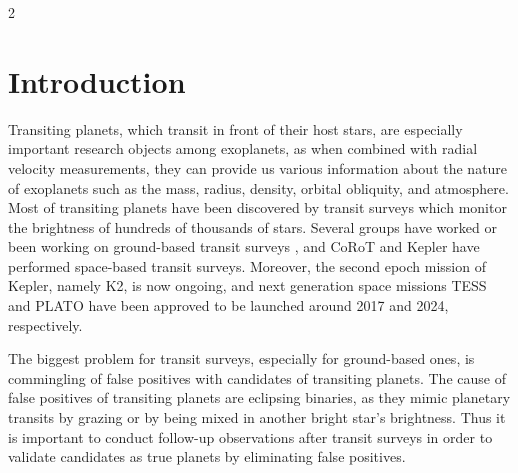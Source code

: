 \documentclass[a4paper,12pt]{spieman}  %
\begin{document}
\begin{spacing}{2}   %

\section{Introduction}
\label{sect:intro}  %

Transiting planets, which transit in front of their host stars, are especially
important research objects among exoplanets, as when combined with radial velocity measurements,
they can provide us various information about the nature of exoplanets such as
the mass, radius, density, orbital obliquity, and atmosphere.
Most of transiting planets have been discovered by transit surveys which monitor the brightness
of hundreds of thousands of stars.
Several groups have worked or been working on ground-based transit surveys
\cite{2007ApJ...656..552B,2007MNRAS.375..951C,2012ApJ...761..123S},
and CoRoT\cite{2006cosp...36.3749B} and Kepler\cite{2010Sci...327..977B} have performed space-based transit surveys.
Moreover, the second epoch mission of Kepler, namely K2\cite{2014PASP..126..398H}, is now ongoing,
and next generation space missions TESS\cite{2015JATIS...1a4003R} and
PLATO\cite{2014ExA....38..249R} have been approved to be launched around 2017 and 2024, respectively.

The biggest problem for transit surveys, especially for ground-based ones, is
commingling of false positives with candidates of transiting planets.
The cause of false positives of transiting planets are eclipsing binaries, as they mimic
planetary transits by grazing or by being mixed in another bright star's brightness.
Thus it is important to conduct follow-up observations after transit surveys
in order to validate candidates as true planets by eliminating false positives.


\end{spacing}
\end{document}
